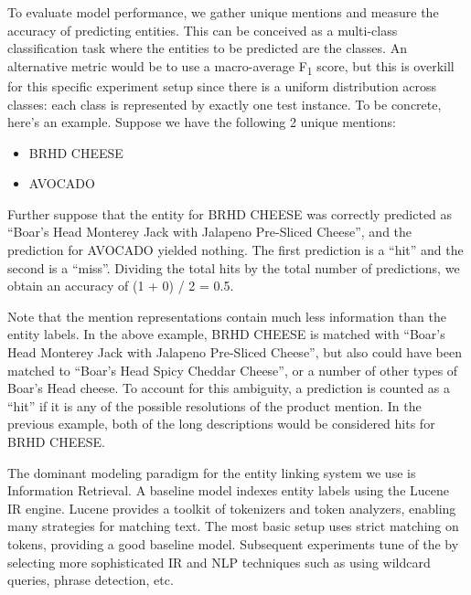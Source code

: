 \documentclass[11pt,a4paper]{article}
\begin{document}
To evaluate model performance, we gather unique mentions and
measure the accuracy of predicting entities.  This can be conceived as
a multi-class classification task where the entities to be predicted
are the classes.  An alternative metric would be to use a
macro-average F\textsubscript{1} score, but this is overkill for this specific
experiment setup since there is a uniform distribution across classes:
each class is represented by exactly one test instance. 
To be concrete, here’s an example.  Suppose we have the following 2
unique mentions: 
\newenvironment{myitemize}
{ \begin{itemize}
    \setlength{\itemsep}{0pt}
    \setlength{\parskip}{0pt}
    \setlength{\parsep}{0pt}     }
{ \end{itemize}                  }

\begin{myitemize}
\item BRHD CHEESE
\item AVOCADO
\end{myitemize}

Further suppose that the entity for BRHD CHEESE was correctly
predicted as “Boar's Head Monterey Jack with Jalapeno Pre-Sliced
Cheese”, and the prediction for AVOCADO yielded nothing.  The first
prediction is a ``hit'' and the second is a ``miss''.  Dividing the
total hits by the total number of predictions, we obtain an accuracy
of (1 + 0) / 2 = 0.5. 

Note that the mention representations contain
much less information than the entity labels.  In the above example,
BRHD CHEESE is matched with  ``Boar's Head Monterey Jack with Jalapeno
Pre-Sliced Cheese'', but also could have been matched to  ``Boar's
Head Spicy Cheddar Cheese'', or a number of other types of Boar’s Head
cheese.  To account for this ambiguity, a prediction is counted as a
“hit” if it is any of the possible resolutions of the product mention.
In the previous example, both of the long descriptions would be
considered hits for BRHD CHEESE. 

The dominant modeling paradigm for the entity linking system we use is
Information Retrieval.   A baseline model indexes entity labels using the Lucene
~\cite{lucene} IR
engine.  Lucene provides a toolkit of tokenizers and token analyzers,
enabling many strategies for matching text.  The most basic setup uses
strict matching on tokens, providing a good baseline model.
Subsequent experiments tune of the by selecting more
sophisticated IR and NLP techniques such as using wildcard
queries, phrase detection, etc.
\end{document}
